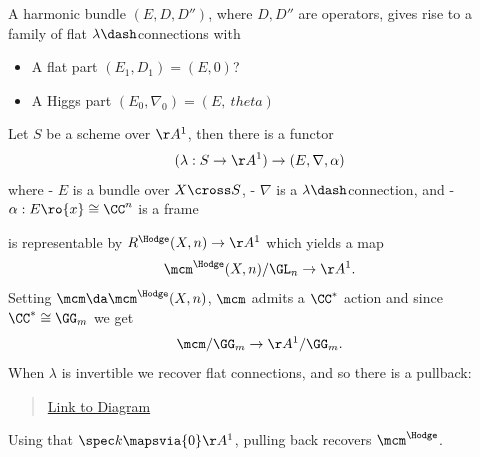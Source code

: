 \begin{proposition}[Key]

A harmonic bundle \((E, D, D'')\), where \(D, D''\) are operators, gives
rise to a family of flat \(\lambda\dash\)connections with

\begin{itemize}
\tightlist
\item
  A flat part \((E_1, D_1) = (E, 0)\)?
\item
  A Higgs part \((E_0, \nabla_0) = (E,\ theta)\)
\end{itemize}

\end{proposition}

\begin{theorem}[Simpson]

Let \(S\) be a scheme over \(\AA^1\), then there is a functor
\begin{align*}
(\lambda:S\to \AA^1) \to (E, \nabla, \alpha)
\end{align*}
where - \(E\) is a bundle over \(X\cross S\), - \(\nabla\) is a
\(\lambda\dash\)connection, and - \(\alpha: E \ro{x} \cong \CC^n\) is a
frame

is representable by \(R^{\Hodge}(X, n) \to \AA^1\) which yields a map
\begin{align*}
\mcm^{\Hodge}(X, n) / \GL_n \to \AA^1
.\end{align*}
Setting \(\mcm \da \mcm^\Hodge(X, n)\), \(\mcm\) admits a \(\CC^*\)
action and since \(\CC^* \cong \GG_m\) we get
\begin{align*}
\mcm/\GG_m \to \AA^1/\GG_m
.\end{align*}
When \(\lambda\) is invertible we recover flat connections, and so there
is a pullback:

\begin{center}
\end{center}

\begin{quote}
\href{https://q.uiver.app/?q=WzAsNCxbMCwwLCJcXG1jbV9cXGRSIFxcY3Jvc3MgXFxHR19tIl0sWzAsMiwiXFxHR19tIl0sWzIsMCwiXFxtY20iXSxbMiwyLCJcXEFBXjEiXSxbMiwzXSxbMSwzXSxbMCwyXSxbMCwxXSxbMCwzLCIiLDEseyJzdHlsZSI6eyJuYW1lIjoiY29ybmVyIn19XV0=}{Link
to Diagram}
\end{quote}

Using that \(\spec k \mapsvia{0} \AA^1\), pulling back recovers
\(\mcm^{\Hodge}\).

\end{theorem}

